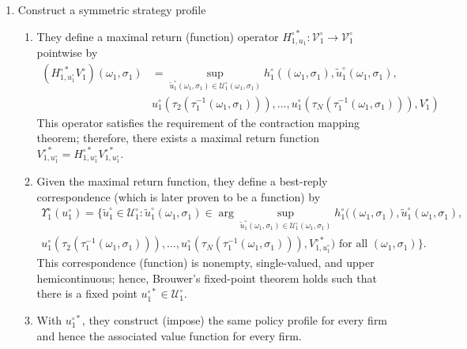 \documentclass[12pt]{article}[margin=1in]
\begin{document}
\begin{enumerate}
    \item Construct a symmetric strategy profile
    \begin{enumerate}
        \item They define a maximal return (function) operator $H^{\circ *}_{1,u_1}:\mathcal{V}_1^\circ \to \mathcal{V}_1^\circ$ pointwise by
        \begin{equation*}
            \begin{split}
                \left( H_{1, u_1^\circ}^{\circ *} V_1^\circ \right)(\omega_1, \sigma_1)& =
    \sup_{\tilde{u}_1^\circ (\omega_1, \sigma_1) \in \mathcal{U}_1^\circ (\omega_1, \sigma_1)}
    h_1^\circ \left( (\omega_1, \sigma_1), \tilde{u}_1^\circ (\omega_1, \sigma_1), \right.\\
    & \left. u_1^\circ (\tau_2 (\tau_1^{-1} (\omega_1, \sigma_1))), \dots, 
    u_1^\circ (\tau_N (\tau_1^{-1} (\omega_1, \sigma_1))), V_1^\circ \right)
            \end{split}
        \end{equation*}
     This operator satisfies the requirement of the contraction mapping theorem; therefore, there exists a maximal return function $V_{1, u_1^\circ}^{\circ *} = H_{1, u_1^\circ}^{\circ *} V_{1, u_1^\circ}^{\circ *}$.
    \item Given the maximal return function, they define a best-reply correspondence (which is later proven to be a function) by 
    \begin{equation*}
        \begin{split}
        \Upsilon_1^\circ (u_1^\circ) = 
        \Bigg\{ \tilde{u}_1^\circ \in \mathcal{U}_1^\circ : 
        \tilde{u}_1^\circ (\omega_1, \sigma_1) \in  
        \arg \sup_{\tilde{u}_1^\circ (\omega_1, \sigma_1) \in \mathcal{U}_1^\circ (\omega_1, \sigma_1)}
        h_1^\circ \Big( (\omega_1, \sigma_1), \tilde{u}_1^\circ (\omega_1, \sigma_1), \\
        u_1^\circ (\tau_2 (\tau_1^{-1} (\omega_1, \sigma_1))), \dots, 
        u_1^\circ (\tau_N (\tau_1^{-1} (\omega_1, \sigma_1))), V_{1, u_1^\circ}^{\circ *} \Big)
        \text{ for all } (\omega_1, \sigma_1) \Bigg\}.
        \end{split}
        \end{equation*}        
This correspondence (function) is nonempty, single-valued, and upper hemicontinuous; hence, Brouwer's fixed-point theorem holds such that there is a fixed point $u_1^{\circ *}\in \mathcal{U}_1^\circ$. 
\item With $u_1^{\circ *}$, they construct (impose) the same policy profile for every firm and hence the associated value function for every firm. 
\end{enumerate}


\end{enumerate}
\end{document}
